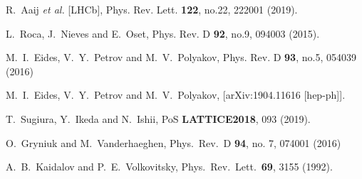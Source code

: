 \documentclass[prd,amsmath,%
twocolumn,floatfix,amssymb, preprintnumbers, nofootinbib, superscriptaddress]{revtex4}
\begin{document}
\begin{thebibliography}{99}
R.~Aaij \textit{et al.} [LHCb],
Phys. Rev. Lett. \textbf{122}, no.22, 222001 (2019). 


L.~Roca, J.~Nieves and E.~Oset,
Phys. Rev. D \textbf{92}, no.9, 094003 (2015). 


M.~I.~Eides, V.~Y.~Petrov and M.~V.~Polyakov,
Phys. Rev. D \textbf{93}, no.5, 054039 (2016)


M.~I.~Eides, V.~Y.~Petrov and M.~V.~Polyakov,
[arXiv:1904.11616 [hep-ph]].


T.~Sugiura, Y.~Ikeda and N.~Ishii,
PoS \textbf{LATTICE2018}, 093 (2019). 







  O.~Gryniuk and M.~Vanderhaeghen,
  Phys.\ Rev.\ D {\bf 94}, no. 7, 074001 (2016)

  A.~B.~Kaidalov and P.~E.~Volkovitsky,
  Phys.\ Rev.\ Lett.\  {\bf 69}, 3155 (1992).



\end{thebibliography}
\end{document}
